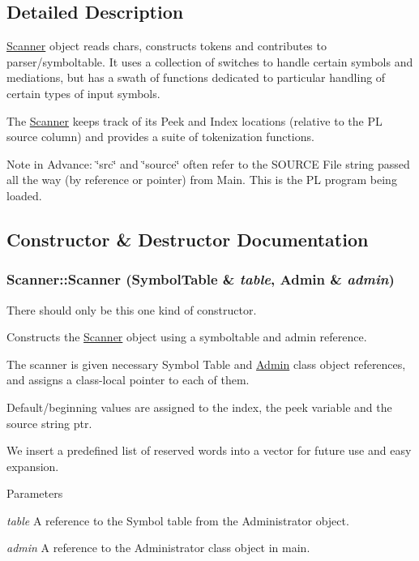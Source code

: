 \subsection{Detailed Description}
\hyperlink{classScanner}{Scanner} object reads chars, constructs tokens and contributes to parser/symboltable. It uses a collection of switches to handle certain symbols and mediations, but has a swath of functions dedicated to particular handling of certain types of input symbols.

The \hyperlink{classScanner}{Scanner} keeps track of its Peek and Index locations (relative to the PL source column) and provides a suite of tokenization functions.

Note in Advance: \char`\"{}src\char`\"{} and \char`\"{}source\char`\"{} often refer to the SOURCE File string passed all the way (by reference or pointer) from Main. This is the PL program being loaded. 

\subsection{Constructor \& Destructor Documentation}
\hypertarget{classScanner_afeff639ac96107cdd8f439a09ebceb1f}{
\subsubsection[{Scanner}]{\setlength{\rightskip}{0pt plus 5cm}Scanner::Scanner ({\bf SymbolTable} \& {\em table}, \/  {\bf Admin} \& {\em admin})}}
\label{classScanner_afeff639ac96107cdd8f439a09ebceb1f}


There should only be this one kind of constructor. 

Constructs the \hyperlink{classScanner}{Scanner} object using a symboltable and admin reference.

The scanner is given necessary Symbol Table and \hyperlink{classAdmin}{Admin} class object references, and assigns a class-\/local pointer to each of them.

Default/beginning values are assigned to the index, the peek variable and the source string ptr.

We insert a predefined list of reserved words into a vector for future use and easy expansion.


\begin{DoxyParams}{Parameters}
\item[{\em table}]A reference to the Symbol table from the Administrator object. \item[{\em admin}]A reference to the Administrator class object in main. \end{DoxyParams}


